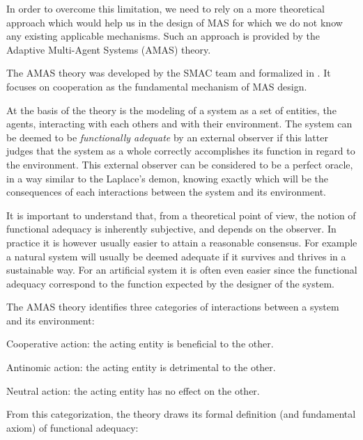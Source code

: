 In order to overcome this limitation, we need to rely on a more theoretical approach which would help us in the design of MAS for which we do not know any existing applicable mechanisms. Such an approach is provided by the Adaptive Multi-Agent Systems (AMAS) theory.

The AMAS theory was developed by the SMAC team and formalized in \cite{glize2001adaptation}. It focuses on cooperation as the fundamental mechanism of MAS design.


At the basis of the theory is the modeling of a system as a set of entities, the agents, interacting with each others and with their environment. The system can be deemed to be \emph{functionally adequate} by an external observer if this latter judges that the system as a whole correctly accomplishes its function in regard to the environment. This external observer can be considered to be a perfect oracle, in a way similar to the Laplace's demon, knowing exactly which will be the consequences of each interactions between the system and its environment.

It is important to understand that, from a theoretical point of view, the notion of functional adequacy is inherently subjective, and depends on the observer. In practice it is however usually easier to attain a reasonable consensus. For example a natural system will usually be deemed adequate if it survives and thrives in a sustainable way. For an artificial system it is often even easier since the functional adequacy correspond to the function expected by the designer of the system.

The AMAS theory identifies three categories of interactions between a system and its environment:
\begin{compactitem}
\item Cooperative action: the acting entity is beneficial to the other.
\item Antinomic action: the acting entity is detrimental to the other.
\item Neutral action: the acting entity has no effect on the other.
\end{compactitem}

From this categorization, the theory draws its formal definition (and fundamental axiom) of functional adequacy:

